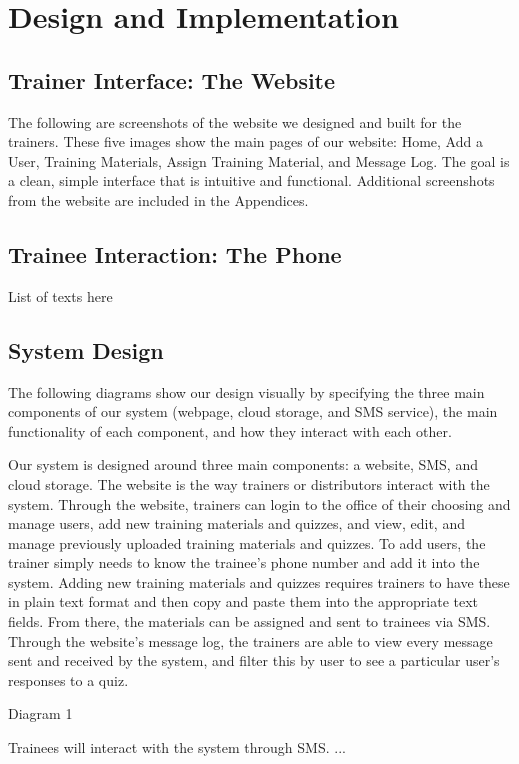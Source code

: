 \chapter{Design and Implementation}

\section{Trainer Interface: The Website}
The following are screenshots of the website we designed and built for the trainers. These five images show the main pages of our website: Home, Add a User, Training Materials, Assign Training Material, and Message Log. The goal is a clean, simple interface that is intuitive and functional. Additional screenshots from the website are included in the Appendices.

\section{Trainee Interaction: The Phone}
List of texts here

\section{System Design}
The following diagrams show our design visually by specifying the three main components of our system (webpage, cloud storage, and SMS service), the main functionality of each component, and how they interact with each other.

Our system is designed around three main components: a website, SMS, and cloud storage. The website is the way trainers or distributors interact with the system. Through the website, trainers can login to the office of their choosing and manage users, add new training materials and quizzes, and view, edit, and manage previously uploaded training materials and quizzes. To add users, the trainer simply needs to know the trainee's phone number and add it into the system. Adding new training materials and quizzes requires trainers to have these in plain text format and then copy and paste them into the appropriate text fields. From there, the materials can be assigned and sent to trainees via SMS. Through the website's message log, the trainers are able to view every message sent and received by the system, and filter this by user to see a particular user's responses to a quiz.

Diagram 1

Trainees will interact with the system through SMS. ...

